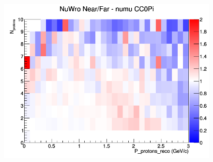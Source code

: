 \begin{figure}[h]
\endminipage
{}
\includegraphics[width=\linewidth]{eff_N_P/LAr/protons/ratios/CC0Pi_NuWro_numu_NF_N_P.png}
\endminipage
\newline
\end{figure}
\clearpage
